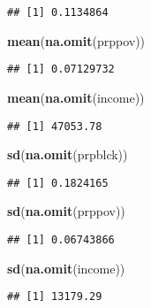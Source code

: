 \documentclass[]{article}
\newenvironment{Shaded}{\begin{snugshade}}{\end{snugshade}}
\newcommand{\KeywordTok}[1]{\textcolor[rgb]{0.13,0.29,0.53}{\textbf{#1}}}
\newcommand{\NormalTok}[1]{#1}
\begin{document}
\begin{verbatim}
## [1] 0.1134864
\end{verbatim}

\begin{Shaded}
\begin{Highlighting}[]
\KeywordTok{mean}\NormalTok{(}\KeywordTok{na.omit}\NormalTok{(prppov))}
\end{Highlighting}
\end{Shaded}

\begin{verbatim}
## [1] 0.07129732
\end{verbatim}

\begin{Shaded}
\begin{Highlighting}[]
\KeywordTok{mean}\NormalTok{(}\KeywordTok{na.omit}\NormalTok{(income))}
\end{Highlighting}
\end{Shaded}

\begin{verbatim}
## [1] 47053.78
\end{verbatim}

\begin{Shaded}
\begin{Highlighting}[]
\KeywordTok{sd}\NormalTok{(}\KeywordTok{na.omit}\NormalTok{(prpblck))}
\end{Highlighting}
\end{Shaded}

\begin{verbatim}
## [1] 0.1824165
\end{verbatim}

\begin{Shaded}
\begin{Highlighting}[]
\KeywordTok{sd}\NormalTok{(}\KeywordTok{na.omit}\NormalTok{(prppov))}
\end{Highlighting}
\end{Shaded}

\begin{verbatim}
## [1] 0.06743866
\end{verbatim}

\begin{Shaded}
\begin{Highlighting}[]
\KeywordTok{sd}\NormalTok{(}\KeywordTok{na.omit}\NormalTok{(income))}
\end{Highlighting}
\end{Shaded}

\begin{verbatim}
## [1] 13179.29
\end{verbatim}
\end{document}
